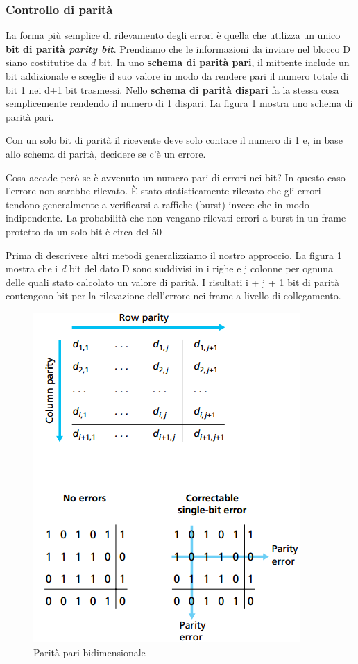 \documentclass[11pt,a4paper]{article}
\begin{document}
\subsubsection{Controllo di parità}
La forma più semplice di rilevamento degli errori è quella che utilizza un unico \textbf{bit di parità \textit{parity bit}}. Prendiamo che le informazioni da inviare nel blocco D siano costitutite da \emph{d} bit. In uno \textbf{schema di parità pari}, il mittente include un bit addizionale e sceglie il suo valore in modo da rendere pari il numero totale di bit 1 nei d+1 bit trasmessi. Nello \textbf{schema di parità dispari} fa la stessa cosa semplicemente rendendo il numero di 1 dispari. La figura \ref{fig: 072} mostra uno schema di parità pari.

Con un solo bit di parità il ricevente deve solo contare il numero di 1 e, in base allo schema di parità, decidere se c'è un errore.

Cosa accade però se è avvenuto un numero pari di errori nei bit? In questo caso l'errore non sarebbe rilevato. È stato statisticamente rilevato che gli errori tendono generalmente a verificarsi a raffiche (burst) invece che in modo indipendente. La probabilità che non vengano rilevati errori a burst in un frame protetto da un solo bit è circa del 50%

Prima di descrivere altri metodi generalizziamo il nostro approccio. La figura \ref{fig: 072} mostra che i \emph{d} bit del dato D sono suddivisi in i righe e j colonne per ognuna delle quali  stato calcolato un valore di parità. I risultati i + j + 1 bit di parità contengono bit per la rilevazione dell'errore nei frame a livello di collegamento.
\begin{figure}
	\begin{center}
		\includegraphics[scale=0.5]{img/072.png}
		\caption{Parità pari bidimensionale}
		\label{fig: 072}
	\end{center}
\end{figure}
\end{document}
